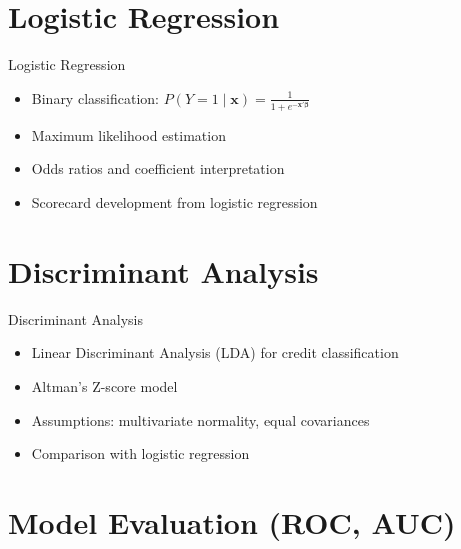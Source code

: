 \documentclass[9pt, aspectratio=169, t]{beamer}
\theoremstyle{definition}
\begin{document}
\section{Logistic Regression}

\begin{frame}{Logistic Regression}
    \begin{itemize}
        \item Binary classification: $P(Y=1 \mid \mathbf{x}) = \frac{1}{1 + e^{-\mathbf{x}'\bm{\beta}}}$
        \item Maximum likelihood estimation
        \item Odds ratios and coefficient interpretation
        \item Scorecard development from logistic regression
    \end{itemize}
\end{frame}

\section{Discriminant Analysis}

\begin{frame}{Discriminant Analysis}
    \begin{itemize}
        \item Linear Discriminant Analysis (LDA) for credit classification
        \item Altman's Z-score model
        \item Assumptions: multivariate normality, equal covariances
        \item Comparison with logistic regression
    \end{itemize}
\end{frame}

\section{Model Evaluation (ROC, AUC)}
\end{document}
